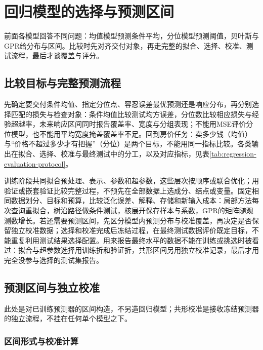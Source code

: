 \section{回归模型的选择与预测区间}
\label{sec:regression-selection}

前面各模型回答不同问题：均值模型预测条件平均，分位模型预测阈值，贝叶斯与GPR给分布与区间。比较时先对齐交付对象，再走完整的拟合、选择、校准、测试流程，最后才谈覆盖与评分。

\subsection{比较目标与完整预测流程}
\label{sec:regression-comparison-goal}

先确定要交付条件均值、指定分位点、容忍误差最优预测还是响应分布，再分别选择匹配的损失与检查对象：条件均值比较测试均方误差，分位数比较相应损失与经验超越率，未来响应区间同时报告覆盖率、宽度与分组表现；不能用MSE评价分位模型，也不能用平均宽度掩盖覆盖率不足。回到房价任务：卖多少钱（均值）与“价格不超过多少才有把握”（分位）是两个目标，不能用同一指标比较。各类输出在拟合、选择、校准与最终测试中的分工，以及对应指标，见表\ref{tab:regression-evaluation-protocol}。

训练阶段共同拟合预处理、表示、参数和超参数，这些层次按顺序或联合优化；用验证或嵌套验证比较完整过程，不预先在全部数据上选成分、结点或变量。固定相同数据划分、目标和预算，比较泛化误差、解释、存储和新输入成本：局部方法每次查询重拟合，树沿路径做条件测试，核展开保存样本与系数，GPR的矩阵随观测数增长。若还需要预测区间，先区分模型内预测分布与校准覆盖，再决定是否保留独立校准数据；选择和校准完成后冻结过程，在最终测试数据评价既定目标，不能重复利用测试结果选择配置。用来报告最终水平的数据不能在训练或挑选时被看过：拟合与超参数选择用训练折和验证折，共形区间另用独立校准记录，最后才用完全没参与选择的测试集报告。



\subsection{预测区间与独立校准}
\label{sec:regression-prediction-interval}

此处是对已训练预测器的区间构造，不另造回归模型；共形校准是接收冻结预测器的独立流程，不挂在任何单个模型之下。

\subsubsection{区间形式与校准计算}
\label{sec:regression-conformal}

